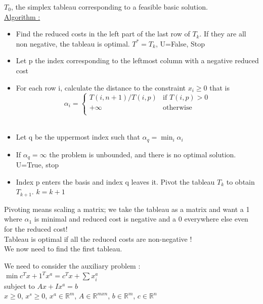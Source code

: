 \documentclass[../main.tex]{subfiles}
\begin{document}
$T_0$, the simplex tableau corresponding to a feasible basic solution.\\

\quad \underline{Algorithm :}\begin{itemize}
    \item Find the reduced costs in the left part of the last row of $T_k$. If they are all non negative, the tableau is optimal. $T^* = T_k$, U=False, Stop\\
    \item Let p the index corresponding to the leftmost column with a negative reduced cost\\
    \item For each row i, calculate the distance to the constraint $x_i\geq 0$ that is \begin{equation}
        \alpha_i = \begin{cases}
            T(i,n+1)/T(i,p) & \text{if } T(i,p) >0\\
            +\infty & \text{otherwise}\\
        \end{cases}
    \end{equation}\\
    \item Let q be the uppermost index such that $\alpha_q = \min_i \alpha_i$\\
    \item If $\alpha_q = \infty$ the problem is unbounded, and there is no optimal solution. U=True, stop\\
    \item Index p enters the basis and index q leaves it. Pivot the tableau $T_k$ to obtain $T_{k+1}$. $k=k+1$\\
\end{itemize}
\warning Pivoting means scaling a matrix; we take the tableau as a matrix and want a 1 where $\alpha_1$ is minimal and reduced cost is negative and a 0 everywhere else even for the reduced cost!\\

\warning Tableau is optimal if all the reduced costs are non-negative !\\
We now need to find the first tableau.

We need to consider the auxiliary problem :\\
$\min c^Tx +1^Tx^a = c^Tx + \sum x_i^a$\\
subject to $Ax + Ix^a = b$\\
$x\geq 0$, $x^s\geq 0$, $x^a \in \mathbb{R}^m$, $A\in\mathbb{R}^{mxn}$, $b\in \mathbb{R}^m$, $c\in \mathbb{R}^n$\\
\end{document}
